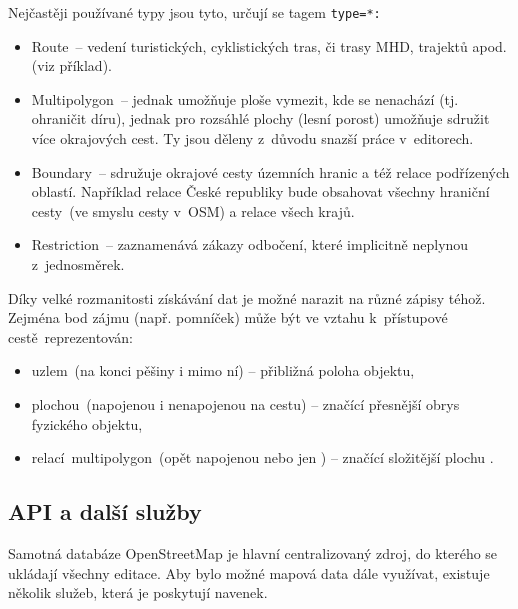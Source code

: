 Nejčastěji používané typy jsou tyto, určují se tagem \texttt{type=*:}

\begin{itemize}

\item
  Route~-- vedení turistických, cyklistických tras, či trasy MHD, trajektů apod. (viz příklad).
\item
  Multipolygon~-- jednak umožňuje ploše vymezit, kde se nenachází (tj. ohraničit díru), jednak pro rozsáhlé plochy (lesní porost) umožňuje sdružit více okrajových cest. Ty jsou děleny z~důvodu snazší práce v~editorech.
\item
  Boundary~-- sdružuje okrajové cesty územních hranic a též relace podřízených oblastí. Například relace České republiky bude obsahovat všechny hraniční cesty~(ve smyslu cesty v~OSM) a relace všech krajů.
\item
  Restriction~-- zaznamenává zákazy odbočení, které implicitně neplynou z~jednosměrek.
\end{itemize}

Díky velké rozmanitosti získávání dat je možné narazit na různé zápisy téhož. Zejména bod zájmu (např. pomníček) může být ve vztahu k~přístupové cestě~reprezentován:

\begin{itemize}

\item
  uzlem~(na konci pěšiny i mimo ní) -- přibližná poloha objektu,
\item
  plochou~(napojenou i nenapojenou na cestu) -- značící přesnější obrys fyzického objektu,
\item
  relací~multipolygon~(opět napojenou nebo jen ) -- značící složitější plochu .
\end{itemize}

\subsection{API a další služby}\label{api-a-dalux161uxed-sluux17eby}

Samotná databáze OpenStreetMap je hlavní centralizovaný zdroj, do kterého se ukládají všechny editace. Aby bylo možné mapová data dále využívat, existuje několik služeb, která je poskytují navenek.

